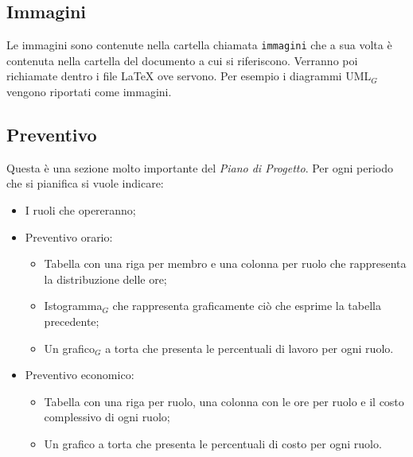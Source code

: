 \subsection{Immagini}
Le immagini sono contenute nella cartella chiamata \texttt{immagini} che a sua volta è contenuta nella cartella del documento a cui si riferiscono. Verranno poi richiamate dentro i file \LaTeX{} ove servono. Per esempio i diagrammi UML$_G$ vengono riportati come immagini.
\subsection{Preventivo}
Questa è una sezione molto importante del \textit{Piano di Progetto}.
Per ogni periodo che si pianifica si vuole indicare:
\begin{itemize}
    \item I ruoli che opereranno;
    \item Preventivo orario:
        \begin{itemize}
            \item Tabella con una riga per membro e una colonna per ruolo che rappresenta la distribuzione delle ore;
            \item Istogramma$_G$ che rappresenta graficamente ciò che esprime la tabella precedente;
            \item Un grafico$_G$ a torta che presenta le percentuali di lavoro per ogni ruolo.
        \end{itemize}
    \item Preventivo economico:
        \begin{itemize}
            \item Tabella con una riga per ruolo, una colonna con le ore per ruolo e il costo complessivo di ogni ruolo;
            \item Un grafico a torta che presenta le percentuali di costo per ogni ruolo.
        \end{itemize}
\end{itemize}

